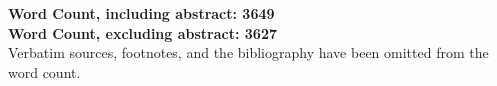 \documentclass[a4paper,oneside]{article}
\newcommand{\wordcount}{3649}
\newcommand{\wordcountabstract}{3627}
\begin{document}
\vfill
\noindent\ignorespacesafterend%
\textbf{%
        Word Count, including abstract: \wordcount\\
        Word Count, excluding abstract: \wordcountabstract\\[1em]
}
Verbatim sources, footnotes, and the bibliography have been omitted from the
word count.

\pagebreak
\printbibliography[title={Cited Works}, heading=bibintoc]
\end{document}
